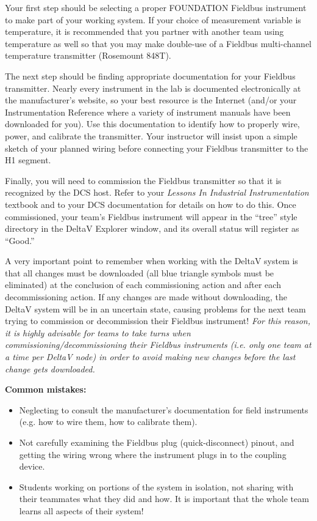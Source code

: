 Your first step should be selecting a proper FOUNDATION Fieldbus instrument to make part of your working system.  If your choice of measurement variable is temperature, it is recommended that you partner with another team using temperature as well so that you may make double-use of a Fieldbus multi-channel temperature transmitter (Rosemount 848T).

The next step should be finding appropriate documentation for your Fieldbus transmitter.  Nearly every instrument in the lab is documented electronically at the manufacturer's website, so your best resource is the Internet (and/or your Instrumentation Reference where a variety of instrument manuals have been downloaded for you).  Use this documentation to identify how to properly wire, power, and calibrate the transmitter.  Your instructor will insist upon a simple sketch of your planned wiring before connecting your Fieldbus transmitter to the H1 segment.

Finally, you will need to commission the Fieldbus transmitter so that it is recognized by the DCS host.  Refer to your {\it Lessons In Industrial Instrumentation} textbook and to your DCS documentation for details on how to do this.  Once commissioned, your team's Fieldbus instrument will appear in the ``tree'' style directory in the DeltaV Explorer window, and its overall status will register as ``Good.''  

A very important point to remember when working with the DeltaV system is that all changes must be downloaded (all blue triangle symbols must be eliminated) at the conclusion of each commissioning action and after each decommissioning action.  If any changes are made without downloading, the DeltaV system will be in an uncertain state, causing problems for the next team trying to commission or decommission their Fieldbus instrument!  {\it For this reason, it is highly advisable for teams to take turns when commissioning/decommissioning their Fieldbus instruments (i.e. only one team at a time per DeltaV node) in order to avoid making new changes before the last change gets downloaded.}

\vskip 10pt

{\bf Common mistakes:}

\begin{itemize}
\item{} Neglecting to consult the manufacturer's documentation for field instruments (e.g. how to wire them, how to calibrate them).
\item{} Not carefully examining the Fieldbus plug (quick-disconnect) pinout, and getting the wiring wrong where the instrument plugs in to the coupling device.
\item{} Students working on portions of the system in isolation, not sharing with their teammates what they did and how.  It is important that the whole team learns all aspects of their system!
\end{itemize}

